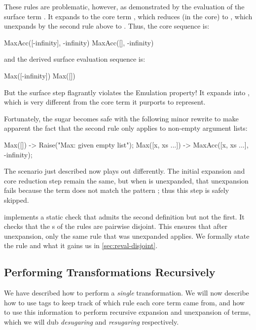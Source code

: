 These rules are problematic, however, as demonstrated by the evaluation of
the surface term . It expands to the core term
, which reduces (in the core)
to , which unexpands by the second rule above to
. Thus, the core sequence is:
\begin{Codes}
    MaxAcc([-infinity], -infinity)
\CoreStep MaxAcc([], -infinity)
\end{Codes}
and the derived surface evaluation sequence is:
\begin{Codes}
    Max([-infinity])
\SurfStep Max([])
\end{Codes}

But the  surface step flagrantly violates the Emulation
property! It expands into , which is very
different from the core term  it purports to
represent.

Fortunately, the  sugar becomes safe with the following minor
rewrite to make apparent the fact that the second rule only applies to
non-empty argument lists:
\begin{Codes}
Max([]) -> Raise("Max: given empty list");
Max([x, xs ...]) -> MaxAcc([x, xs ...], -infinity);
\end{Codes}
The scenario just described now plays out differently. The initial
expansion and core reduction step remain the same, but when
 is unexpanded, that unexpansion fails because
the term does not match the  pattern ; thus this step is safely skipped.

{\Resugarer} implements a static check that admits the second definition
but not the first. It checks that the s of the rules are pairwise
disjoint. This
ensures that after unexpansion, only the same rule that was unexpanded
applies. We formally state the rule and what it gains us in
\cref{sec:reval-disjoint}.

\subsection{Performing Transformations Recursively}
\label{sec:reval-manyrule}

We have described how to perform a \emph{single} transformation. We will now
describe how to use tags to keep track of which rule each core term came
from, and how to use this information to perform recursive expansion and
unexpansion of terms, which we will dub \emph{desugaring} and
\emph{resugaring} respectively.

